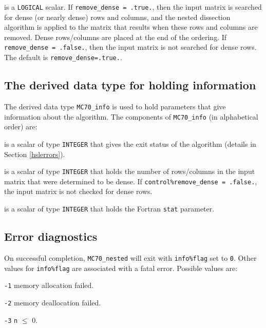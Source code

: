 \documentclass{stfc}
\begin{document}
\begin{description}
 is a {\tt LOGICAL} scalar. If {\tt remove\_dense = .true.}, 
then the input matrix is searched for dense (or nearly dense) rows and columns, 
and the nested dissection algorithm is applied to the matrix that results when 
these rows and columns are removed. Dense rows/columns are placed at the end of 
the ordering. If {\tt remove\_dense = .false.}, then the input matrix is not 
searched for dense rows. The default is {\tt remove\_dense=.true.}.


\end{description}



\subsection{The derived data type for holding information}
\label{typeinform}
The derived data type {\tt MC70\_info} 
is used to hold parameters that give information about 
the algorithm. The components of {\tt MC70\_info} 
(in alphabetical order) are:

\begin{description}

 is a scalar of type  {\tt INTEGER}
that gives the exit status of the algorithm (details in Section \ref{hslerrors}).

 is a scalar of type {\tt INTEGER} that holds 
the number of rows/columns in the input matrix that were determined to be dense. 
If {\tt control\%remove\_dense = .false.}, the input matrix is not checked for 
dense rows.

 is a scalar of type  {\tt INTEGER}
that holds the Fortran {\tt stat} parameter. 
\end{description}



\subsection{Error diagnostics\label{hslerrors}}

On successful completion, {\tt MC70\_nested} 
will exit with  {\tt info\%flag} set to {\tt 0}. Other values
for {\tt info\%flag} are associated with a fatal error. 
Possible values are:
\vspace{-0.1cm}
\begin{description}
\item{} {\tt -1} memory allocation failed.
\item{} {\tt -2} memory deallocation failed.
\item{} {\tt -3} {\tt n} $\le$ 0.

\end{description}
\end{document}
